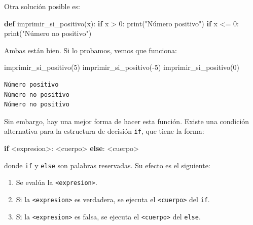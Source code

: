 \documentclass[
  letterpaper,
  DIV=11,
  numbers=noendperiod]{scrreprt}
\newenvironment{Shaded}{\begin{snugshade}}{\end{snugshade}}
\newcommand{\BuiltInTok}[1]{\textcolor[rgb]{0.00,0.23,0.31}{#1}}
\newcommand{\ControlFlowTok}[1]{\textcolor[rgb]{0.00,0.23,0.31}{\textbf{#1}}}
\newcommand{\DecValTok}[1]{\textcolor[rgb]{0.68,0.00,0.00}{#1}}
\newcommand{\KeywordTok}[1]{\textcolor[rgb]{0.00,0.23,0.31}{\textbf{#1}}}
\newcommand{\NormalTok}[1]{\textcolor[rgb]{0.00,0.23,0.31}{#1}}
\newcommand{\OperatorTok}[1]{\textcolor[rgb]{0.37,0.37,0.37}{#1}}
\newcommand{\StringTok}[1]{\textcolor[rgb]{0.13,0.47,0.30}{#1}}
\providecommand{\tightlist}{%
  \setlength{\itemsep}{0pt}\setlength{\parskip}{0pt}}\usepackage{longtable,booktabs,array}
\begin{document}
Otra solución posible es:

\begin{Shaded}
\begin{Highlighting}[]
\KeywordTok{def}\NormalTok{ imprimir\_si\_positivo(x):}
  \ControlFlowTok{if}\NormalTok{ x }\OperatorTok{\textgreater{}} \DecValTok{0}\NormalTok{:}
      \BuiltInTok{print}\NormalTok{(}\StringTok{"Número positivo"}\NormalTok{)}
  \ControlFlowTok{if}\NormalTok{ x }\OperatorTok{\textless{}=} \DecValTok{0}\NormalTok{:}
      \BuiltInTok{print}\NormalTok{(}\StringTok{"Número no positivo"}\NormalTok{)}
\end{Highlighting}
\end{Shaded}

Ambas están bien. Si lo probamos, vemos que funciona:

\begin{Shaded}
\begin{Highlighting}[]
\NormalTok{imprimir\_si\_positivo(}\DecValTok{5}\NormalTok{)}
\NormalTok{imprimir\_si\_positivo(}\OperatorTok{{-}}\DecValTok{5}\NormalTok{)}
\NormalTok{imprimir\_si\_positivo(}\DecValTok{0}\NormalTok{)}
\end{Highlighting}
\end{Shaded}

\begin{verbatim}
Número positivo
Número no positivo
Número no positivo
\end{verbatim}

Sin embargo, hay una mejor forma de hacer esta función. Existe una
condición alternativa para la estructura de decisión \texttt{if}, que
tiene la forma:

\begin{Shaded}
\begin{Highlighting}[]
\ControlFlowTok{if} \OperatorTok{\textless{}}\NormalTok{expresion}\OperatorTok{\textgreater{}}\NormalTok{:}
    \OperatorTok{\textless{}}\NormalTok{cuerpo}\OperatorTok{\textgreater{}}
\ControlFlowTok{else}\NormalTok{:}
    \OperatorTok{\textless{}}\NormalTok{cuerpo}\OperatorTok{\textgreater{}}
\end{Highlighting}
\end{Shaded}

donde \texttt{if} y \texttt{else} son palabras reservadas. Su efecto es
el siguiente:

\begin{enumerate}
\def\labelenumi{\arabic{enumi}.}
\tightlist
\item
  Se evalúa la \texttt{\textless{}expresion\textgreater{}}.
\item
  Si la \texttt{\textless{}expresion\textgreater{}} es verdadera, se
  ejecuta el \texttt{\textless{}cuerpo\textgreater{}} del \texttt{if}.
\item
  Si la \texttt{\textless{}expresion\textgreater{}} es falsa, se ejecuta
  el \texttt{\textless{}cuerpo\textgreater{}} del \texttt{else}.
\end{enumerate}
\end{document}
